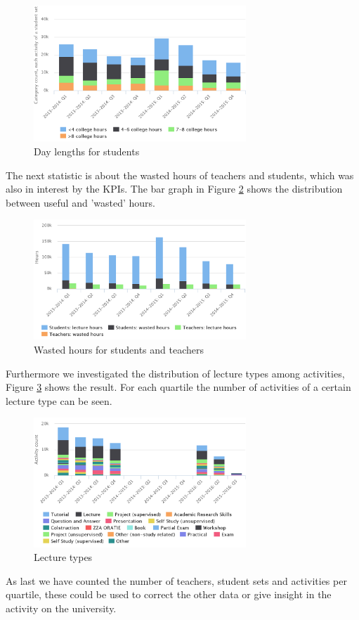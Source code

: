 \begin{figure}[!h]
	\centering
	\includegraphics[width=80mm]{dayLengthsStudents.png}
	\caption{Day lengths for students}
	\label{fig:dayLengtsStudents}
\end{figure}

The next statistic is about the wasted hours of teachers and students, which was also in interest by the KPIs. The bar graph in Figure \ref{fig:wastedHours} shows the distribution between useful and 'wasted' hours.

\begin{figure}[!h]
	\centering
	\includegraphics[width=80mm]{wastedHours.png}
	\caption{Wasted hours for students and teachers}
	\label{fig:wastedHours}
\end{figure}

Furthermore we investigated the distribution of lecture types among activities, Figure \ref{fig:lectureTypes} shows the result. For each quartile the number of activities of a certain lecture type can be seen.

\begin{figure}[!h]
	\centering
	\includegraphics[width=80mm]{lectureTypes.png}
	\caption{Lecture types}
	\label{fig:lectureTypes}
\end{figure}

As last we have counted the number of teachers, student sets and activities per quartile, these could be used to correct the other data or give insight in the activity on the university.
